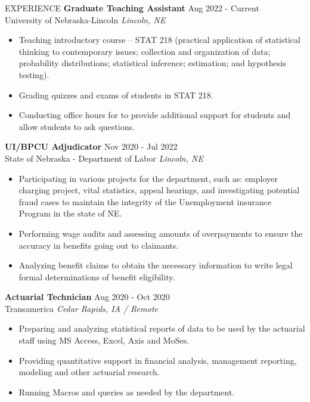 \documentclass{resume} %
\begin{document}
\begin{rSection}{EXPERIENCE}
\textbf{Graduate Teaching Assistant} \hfill Aug 2022 - Current\\
University of Nebraska-Lincoln \hfill \textit{Lincoln, NE}
 \begin{itemize}
    \itemsep -1pt {} 
     \item Teaching introductory course – STAT 218 (practical application of statistical thinking to contemporary issues; collection and organization of data; probability distributions; statistical inference; estimation; and hypothesis testing).
     \item Grading quizzes and exams of students in STAT 218.
    \item Conducting office hours for to provide additional support for students and allow students to ask questions.
 \end{itemize}
\textbf{UI/BPCU Adjudicator} \hfill Nov 2020 - Jul 2022\\
 State of Nebraska - Department of Labor \hfill \textit{Lincoln, NE}
 \begin{itemize}
    \itemsep -1pt {} 
     \item Participating in various projects for the department, such as: employer charging project, vital statistics, appeal hearings, and investigating potential fraud cases to maintain the integrity of the Unemployment insurance Program in the state of NE.
     \item Performing wage audits and assessing amounts of overpayments to ensure the accuracy in benefits going out to claimants.
    \item Analyzing benefit claims to obtain the necessary information to write legal formal determinations of benefit eligibility.
 \end{itemize}
 \textbf{Actuarial Technician} \hfill Aug 2020 - Oct 2020\\
 Transamerica \hfill \textit{Cedar Rapids, IA / Remote}
 \begin{itemize}
    \itemsep -1pt {} 
     \item Preparing and analyzing statistical reports of data to be used by the actuarial staff using MS Access, Excel, Axis and MoSes.
     \item Providing quantitative support in financial analysis, management reporting, modeling and other actuarial research.
    \item Running Macros and queries as needed by the department.
 \end{itemize}
 
\end{rSection} 
\end{document}
